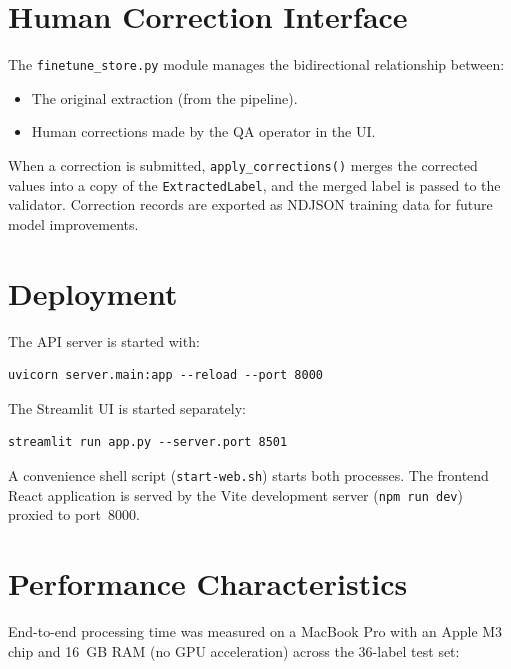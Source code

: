 \section{Human Correction Interface}

The \texttt{finetune\_store.py} module manages the bidirectional relationship between:
\begin{itemize}
  \item The original extraction (from the pipeline).
  \item Human corrections made by the QA operator in the \ac{UI}.
\end{itemize}

When a correction is submitted, \texttt{apply\_corrections()} merges the corrected values
into a copy of the \texttt{ExtractedLabel}, and the merged label is passed to the validator.
Correction records are exported as NDJSON training data for future model improvements.

\section{Deployment}

The API server is started with:
\begin{verbatim}
uvicorn server.main:app --reload --port 8000
\end{verbatim}

The Streamlit \ac{UI} is started separately:
\begin{verbatim}
streamlit run app.py --server.port 8501
\end{verbatim}

A convenience shell script (\texttt{start-web.sh}) starts both processes. The frontend
React application is served by the Vite development server (\texttt{npm run dev}) proxied
to port~8000.

\section{Performance Characteristics}

End-to-end processing time was measured on a MacBook Pro with an Apple M3 chip and 16~GB
RAM (no GPU acceleration) across the 36-label test set:

